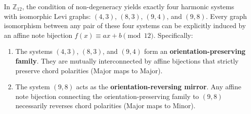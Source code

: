 \documentclass[10pt,a4paper]{amsart}
\newcommand{\Z}{\mathbb{Z}}
\begin{document}
\begin{theorem}
In $\Z_{12}$, the condition of non-degeneracy yields exactly four harmonic systems with isomorphic Levi graphs: $(4,3)$, $(8,3)$, $(9,4)$, and $(9,8)$. Every graph isomorphism between any pair of these four systems can be explicitly induced by an affine note bijection $f(x) \equiv ax + b \pmod{12}$. Specifically:
\begin{enumerate}
    \item The systems $(4,3)$, $(8,3)$, and $(9,4)$ form an \textbf{orientation-preserving family}. They are mutually interconnected by affine bijections that strictly preserve chord polarities (Major maps to Major). 
    \item The system $(9,8)$ acts as the \textbf{orientation-reversing mirror}. Any affine note bijection connecting the orientation-preserving family to $(9,8)$ necessarily reverses chord polarities (Major maps to Minor).
\end{enumerate}
\end{theorem}
\end{document}
